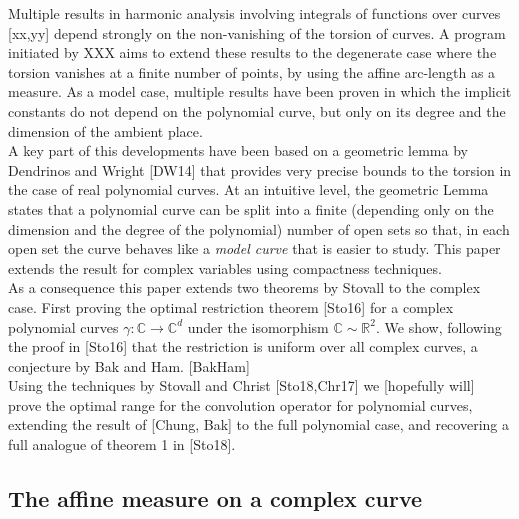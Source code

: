 

	Multiple results in harmonic analysis involving integrals of functions over curves [xx,yy] depend strongly on the non-vanishing of the torsion of curves. A program initiated by XXX aims to extend these results to the degenerate case where the torsion vanishes at a finite number of points, by using the affine arc-length as a measure. As a model case, multiple results have been proven in which the implicit constants do not depend on the polynomial curve, but only on its degree and the dimension of the ambient place.\\

	A key part of this developments have been based on a geometric lemma by Dendrinos and Wright [DW14] that provides very precise bounds to the torsion in the case of real polynomial curves. At an intuitive level, the geometric Lemma states that a polynomial curve can be split into a finite (depending only on the dimension and the degree of the polynomial) number of open sets so that, in each open set the curve behaves like a \textit{model curve} that is easier to study. This paper extends the result for complex variables using compactness techniques. \\

	As a consequence this paper extends two theorems by Stovall to the complex case. First proving the optimal restriction theorem [Sto16] for a complex polynomial curves $\gamma:\mathbb C \to \mathbb C^d$ under the isomorphism $\mathbb C \sim \mathbb R^2$. We show, following the proof in [Sto16] that the restriction is uniform over all complex curves, a conjecture by Bak and Ham. [BakHam]\\

	Using the techniques by Stovall and Christ [Sto18,Chr17]  we [hopefully will] prove the optimal range for the convolution operator for polynomial curves, extending the result of [Chung, Bak] to the full polynomial case, and recovering a full analogue of theorem 1 in [Sto18].\\





	\subsection{The affine measure on a complex curve} %
	\label{sub:the_affine_measure_on_a_complex_curve}
	

